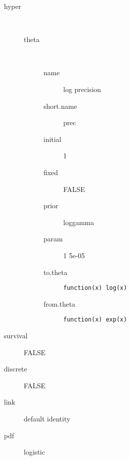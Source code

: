 \begin{description}
	\item[hyper]\ 
	 \begin{description}
	 	\item[theta]\ 
	 	 \begin{description}
	 	 	 \item[ name ] log precision 
	 	 	 \item[ short.name ] prec 
	 	 	 \item[ initial ] 1 
	 	 	 \item[ fixed ] FALSE 
	 	 	 \item[ prior ] loggamma 
	 	 	 \item[ param ] 1 5e-05 
	 	 	 \item[ to.theta ] \verb|function(x) log(x)| 
	 	 	 \item[ from.theta ] \verb|function(x) exp(x)| 
	 	 \end{description}
	 \end{description}
	 \item[ survival ] FALSE 
	 \item[ discrete ] FALSE 
	 \item[ link ] default identity 
	 \item[ pdf ] logistic 
\end{description}
